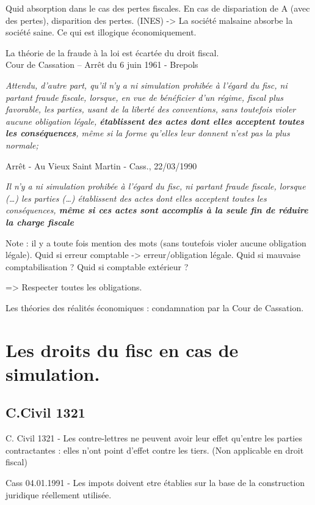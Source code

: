 \documentclass{book}
\begin{document}
Quid absorption dans le cas des pertes fiscales. En cas de dispariation de A (avec des pertes), disparition des pertes. (INES) -> La société malsaine absorbe la société saine. Ce qui est illogique économiquement.

La théorie de la fraude à la loi est écartée du droit fiscal.\\

Cour de Cassation – Arrêt du 6 juin 1961 - Brepols

\textit{Attendu, d’autre part, qu’il n’y a ni simulation prohibée à l’égard du fisc, ni partant fraude fiscale, lorsque, en vue de bénéficier d’un régime, fiscal plus favorable, les parties, usant de la liberté des conventions, sans toutefois violer aucune obligation légale, \textbf{établissent des actes dont elles acceptent toutes les conséquences}, même si la forme qu’elles leur donnent n’est pas la plus normale;}

Arrêt - Au Vieux Saint Martin - Cass., 22/03/1990

\textit{Il n'y a ni simulation prohibée à l'égard du fisc, ni partant fraude fiscale, lorsque (…) les parties (…) établissent des actes dont elles acceptent toutes les conséquences,\textbf{ même si ces actes sont accomplis à la seule fin de réduire la charge fiscale}}

Note : il y a toute fois mention des mots (sans toutefois violer aucune obligation légale). Quid si erreur comptable -> erreur/obligation légale. Quid si mauvaise comptabilisation ? Quid si comptable extérieur ?

=> Respecter toutes les obligations.


Les théories des réalités économiques : condamnation par la Cour de Cassation.


\section{Les droits du fisc en cas de simulation.}

\subsection{C.Civil 1321}
C. Civil 1321 - Les contre-lettres ne peuvent avoir leur effet qu'entre les parties contractantes : elles n'ont point d'effet contre les tiers. (Non applicable en droit fiscal)

Cass 04.01.1991 - Les impots doivent etre établies sur la base de la construction juridique réellement utilisée.
\end{document}
